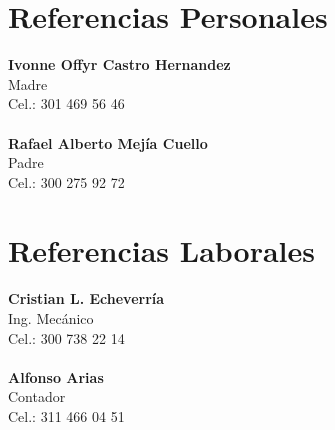 \documentclass[11pt,letterpaper,sans]{moderncv}
\begin{document}
\newpage

\section{Referencias Personales}
\textbf{Ivonne Offyr Castro Hernandez}\\
Madre\\
Cel.: 301 469 56 46\\
\\
\textbf{Rafael Alberto Mejía Cuello}\\
Padre\\
Cel.: 300 275 92 72\\
\section{Referencias Laborales}
\textbf{Cristian L. Echeverría}\\
Ing. Mecánico\\
Cel.: 300 738 22 14\\
\\
\textbf{Alfonso Arias}\\
Contador\\
Cel.: 311 466 04 51\\
\end{document}
